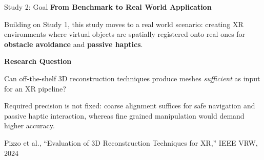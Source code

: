 \documentclass[aspectratio=169, 12pt]{beamer}
\newcommand{\citefooter}[1]{\hfill{\tiny #1}}
\begin{document}
\begin{frame}{Study 2: Goal}
	\textbf{\textcolor{gbAqua}{From Benchmark to Real World Application}}

	Building on Study 1, this study moves to a real world scenario: creating XR environments where virtual objects are spatially registered onto real ones for \textbf{obstacle avoidance} and \textbf{passive haptics}.

	\vspace{0.4cm}

	\textbf{\textcolor{gbAqua}{Research Question}}

	\vspace{0.15cm}

	Can off-the-shelf 3D reconstruction techniques produce meshes \textit{sufficient} as input for an XR pipeline?

	\vspace{0.3cm}

	\alert{Required precision is not fixed}: coarse alignment suffices for safe navigation and passive haptic interaction, whereas fine grained manipulation would demand higher accuracy.

	\citefooter{Pizzo et al., ``Evaluation of 3D Reconstruction Techniques for XR,'' IEEE VRW, 2024}
\end{frame}
\end{document}
